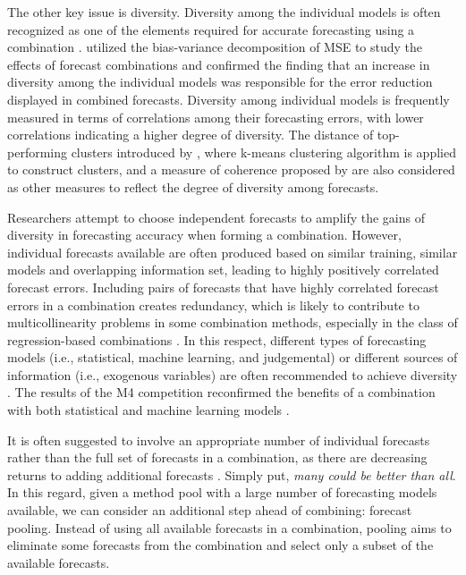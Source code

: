 \documentclass[11pt]{article}
\begin{document}
The other key issue is diversity. Diversity among the individual models is often recognized as one of the elements required for accurate forecasting using a combination \citep{Batchelor1995-ps,Brown2005-aa,Thomson2019-al}. \cite{Atiya2020-ge} utilized the bias-variance decomposition of MSE to study the effects of forecast combinations and confirmed the finding that an increase in diversity among the individual models was responsible for the error reduction displayed in combined forecasts. Diversity among individual models is frequently measured in terms of correlations among their forecasting errors, with lower correlations indicating a higher degree of diversity. The distance of top-performing clusters introduced by \cite{Lemke2010-wn}, where k-means clustering algorithm is applied to construct clusters, and a measure of coherence proposed by \cite{Thomson2019-al} are also considered as other measures to reflect the degree of diversity among forecasts.

Researchers attempt to choose independent forecasts to amplify the gains of diversity in forecasting accuracy when forming a combination. However, individual forecasts available are often produced based on similar training, similar models and overlapping information set, leading to highly positively correlated forecast errors. Including pairs of forecasts that have highly correlated forecast errors in a combination creates redundancy, which is likely to contribute to multicollinearity problems in some combination methods, especially in the class of regression-based combinations \citep{Granger1984-jc}. In this respect, different types of forecasting models (i.e., statistical, machine learning, and judgemental) or different sources of information (i.e., exogenous variables) are often recommended to achieve diversity \citep{Atiya2020-ge}. The results of the M4 competition reconfirmed the benefits of a combination with both statistical and machine learning models \citep{Makridakis2020-hu}.

It is often suggested to involve an appropriate number of individual forecasts rather than the full set of forecasts in a combination, as there are decreasing returns to adding additional forecasts \citep{Armstrong2001-sj,Zhou2002-cg,Geweke2011-xk,Lichtendahl2020-ut}. Simply put, \textit{many could be better than all}. In this regard, given a method pool with a large number of forecasting models available, we can consider an additional step ahead of combining: forecast pooling. Instead of using all available forecasts in a combination, pooling aims to eliminate some forecasts from the combination and select only a subset of the available forecasts.
\end{document}
